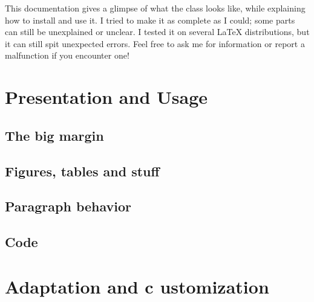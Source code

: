 \documentclass[raggedright, 11pt]{tufte-style-article}
\begin{document}
This documentation gives a glimpse of what the class looks like, while explaining how to install and use it. I tried to make it as complete as I could; some parts can still be unexplained or unclear. I tested it on several \LaTeX{} distributions, but it can still spit unexpected errors. Feel free to ask me for information or report a malfunction if you encounter one!

\section{Presentation and Usage}

\subsection{The big margin}

\subsection{Figures, tables and stuff}

\subsection{Paragraph behavior}

\subsection{Code}

\section{Adaptation and c	ustomization}
\end{document}
